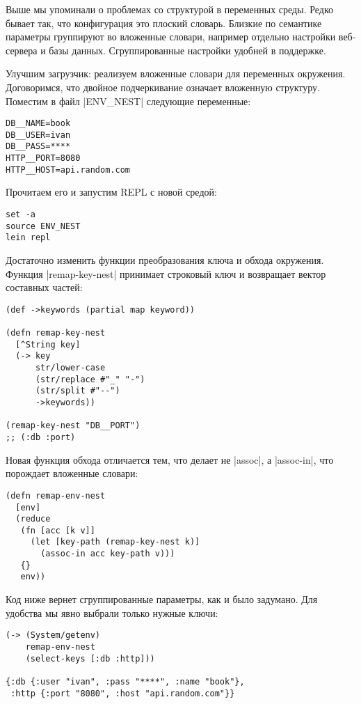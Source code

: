 Выше мы упоминали о проблемах со структурой в переменных среды. Редко бывает
так, что конфигурация это плоский словарь. Близкие по семантике параметры
группируют во вложенные словари, например отдельно настройки веб-сервера и базы
данных. Сгруппированные настройки удобней в поддержке.

Улучшим загрузчик: реализуем вложенные словари для переменных
окружения. Договоримся, что двойное подчеркивание означает вложенную
структуру. Поместим в файл \spverb|ENV_NEST| следующие переменные:

\begin{verbatim}
DB__NAME=book
DB__USER=ivan
DB__PASS=****
HTTP__PORT=8080
HTTP__HOST=api.random.com
\end{verbatim}

Прочитаем его и запустим REPL с новой средой:

\begin{verbatim}
set -a
source ENV_NEST
lein repl
\end{verbatim}

Достаточно изменить функции преобразования ключа и обхода окружения. Функция
\spverb|remap-key-nest| принимает строковый ключ и возвращает вектор составных частей:

\begin{verbatim}
(def ->keywords (partial map keyword))

(defn remap-key-nest
  [^String key]
  (-> key
      str/lower-case
      (str/replace #"_" "-")
      (str/split #"--")
      ->keywords))

(remap-key-nest "DB__PORT")
;; (:db :port)
\end{verbatim}

Новая функция обхода отличается тем, что делает не \spverb|assoc|, а \spverb|assoc-in|, что
порождает вложенные словари:

\begin{verbatim}
(defn remap-env-nest
  [env]
  (reduce
   (fn [acc [k v]]
     (let [key-path (remap-key-nest k)]
       (assoc-in acc key-path v)))
   {}
   env))
\end{verbatim}

Код ниже вернет сгруппированные параметры, как и было задумано. Для удобства мы
явно выбрали только нужные ключи:

\begin{verbatim}
(-> (System/getenv)
    remap-env-nest
    (select-keys [:db :http]))

{:db {:user "ivan", :pass "****", :name "book"},
 :http {:port "8080", :host "api.random.com"}}
\end{verbatim}

